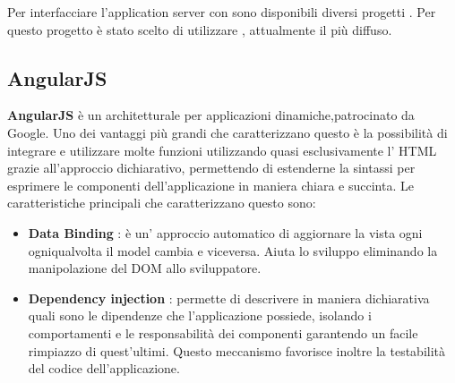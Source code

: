 Per interfacciare l'application server con  sono disponibili diversi progetti . Per questo progetto è stato scelto di utilizzare , attualmente il più diffuso.

\subsection{AngularJS}
\textbf{AngularJS} è un  architetturale per applicazioni dinamiche,patrocinato da Google.
Uno dei vantaggi più grandi che caratterizzano questo  è la possibilità di integrare e utilizzare molte funzioni utilizzando quasi esclusivamente l' HTML grazie all’approccio dichiarativo, permettendo di estenderne la sintassi per esprimere le componenti dell'applicazione in maniera chiara e succinta.
Le caratteristiche principali che caratterizzano questo  sono: 
\begin{itemize} 
\item \textbf{Data Binding} : è un' approccio automatico di aggiornare la vista ogni ogniqualvolta il model cambia e viceversa. Aiuta lo sviluppo eliminando la manipolazione del DOM allo sviluppatore.
\item \textbf{Dependency injection} : permette di descrivere in maniera dichiarativa quali sono le dipendenze che l'applicazione possiede, isolando i comportamenti e le responsabilità dei componenti garantendo un facile rimpiazzo di quest'ultimi.
Questo meccanismo favorisce inoltre la testabilità del codice dell'applicazione.
\end{itemize}







